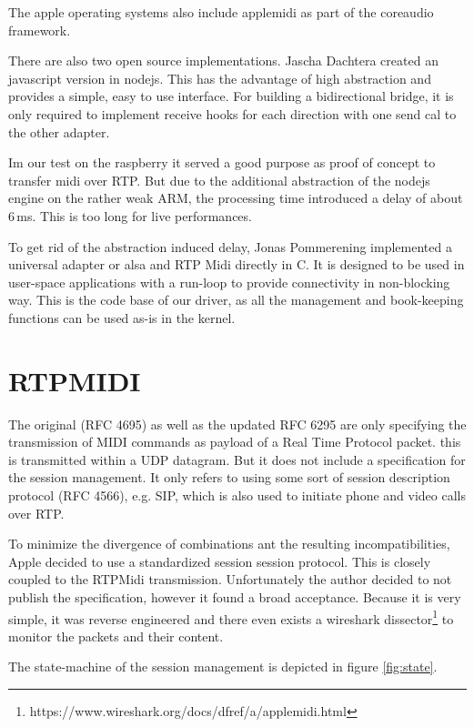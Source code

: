 \documentclass[paper=a4,fontsize=11pt,twocolumn,pagesize,bibtotoc]{scrartcl}
\begin{document}
	The apple operating systems also include applemidi as part of the coreaudio framework.
	
	There are also two open source implementations. 
	Jascha Dachtera created an javascript version in nodejs. This has the advantage of high abstraction and provides a simple, easy to use interface. For building a bidirectional bridge, it is only required to implement receive hooks for each direction with one send cal to the other adapter.
	
	Im our test on the raspberry it served a good purpose as proof of concept to transfer midi over RTP. But due to the additional abstraction of the nodejs engine on the rather weak ARM, the processing time introduced a delay of about 6\,ms. This is too long for live performances.
	
	To get rid of the abstraction induced delay, 
	 Jonas Pommerening 
	implemented a universal adapter or alsa and RTP Midi directly in C. It is designed to be used in user-space applications with a run-loop to provide connectivity in non-blocking way. This is the code base of our driver, as all the management and book-keeping functions can be used as-is in the kernel.
	
	\section{RTPMIDI}
	The original (RFC 4695\cite{rfc4695}) as well as the updated RFC 6295\cite{rfc6295}
	are only specifying the transmission of MIDI commands as payload of a Real Time Protocol packet. this is transmitted within a UDP datagram. But it does not include a specification for the session management. It only refers to using some sort of session description protocol
	(RFC 4566\cite{rfc4566}), e.g. SIP, which is also used to initiate phone and video calls over RTP.
	
	
	To minimize the divergence of combinations ant the resulting incompatibilities, Apple decided to use a standardized session session protocol. This is closely coupled to the RTPMidi transmission. Unfortunately the author decided to not publish the specification, however it found a broad acceptance. Because it is very simple, it was reverse engineered and there even exists a wireshark dissector\footnote{https://www.wireshark.org/docs/dfref/a/applemidi.html} to monitor the packets and their content.
	
	The state-machine of the session management is depicted in figure \ref{fig:state}.
	
\end{document}
